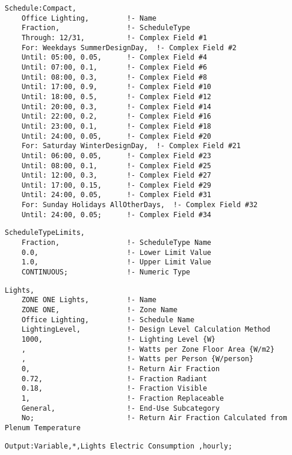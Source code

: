 \begin{lstlisting}
Schedule:Compact,
    Office Lighting,         !- Name
    Fraction,                !- ScheduleType
    Through: 12/31,          !- Complex Field #1
    For: Weekdays SummerDesignDay,  !- Complex Field #2
    Until: 05:00, 0.05,      !- Complex Field #4
    Until: 07:00, 0.1,       !- Complex Field #6
    Until: 08:00, 0.3,       !- Complex Field #8
    Until: 17:00, 0.9,       !- Complex Field #10
    Until: 18:00, 0.5,       !- Complex Field #12
    Until: 20:00, 0.3,       !- Complex Field #14
    Until: 22:00, 0.2,       !- Complex Field #16
    Until: 23:00, 0.1,       !- Complex Field #18
    Until: 24:00, 0.05,      !- Complex Field #20
    For: Saturday WinterDesignDay,  !- Complex Field #21
    Until: 06:00, 0.05,      !- Complex Field #23
    Until: 08:00, 0.1,       !- Complex Field #25
    Until: 12:00, 0.3,       !- Complex Field #27
    Until: 17:00, 0.15,      !- Complex Field #29
    Until: 24:00, 0.05,      !- Complex Field #31
    For: Sunday Holidays AllOtherDays,  !- Complex Field #32
    Until: 24:00, 0.05;      !- Complex Field #34
\end{lstlisting}

\begin{lstlisting}
ScheduleTypeLimits,
    Fraction,                !- ScheduleType Name
    0.0,                     !- Lower Limit Value
    1.0,                     !- Upper Limit Value
    CONTINUOUS;              !- Numeric Type
\end{lstlisting}

\begin{lstlisting}
Lights,
    ZONE ONE Lights,         !- Name
    ZONE ONE,                !- Zone Name
    Office Lighting,         !- Schedule Name
    LightingLevel,           !- Design Level Calculation Method
    1000,                    !- Lighting Level {W}
    ,                        !- Watts per Zone Floor Area {W/m2}
    ,                        !- Watts per Person {W/person}
    0,                       !- Return Air Fraction
    0.72,                    !- Fraction Radiant
    0.18,                    !- Fraction Visible
    1,                       !- Fraction Replaceable
    General,                 !- End-Use Subcategory
    No;                      !- Return Air Fraction Calculated from Plenum Temperature
\end{lstlisting}

\begin{lstlisting}
Output:Variable,*,Lights Electric Consumption ,hourly;
\end{lstlisting}

